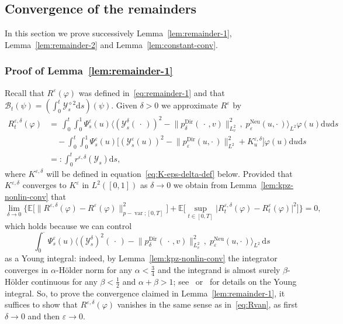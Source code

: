 \documentclass[AHL,Unicode,longabstracts]{cedram}
\DeclareMathOperator{\Dir}{Dir}
\DeclareMathOperator{\Neu}{Neu}
\DeclareMathOperator{\var}{var}
\newcommand{\mc}[1]{{\mathcal #1}}
\renewcommand{\mc}[1]{{\mathcal #1}}
\newcommand*{\dd}{\mathrm{d}}
\newcommand*{\ds}{\dd s}
\newcommand*{\du}{\dd u}
\begin{document}
\subsection{Convergence of the remainders}

In this section we prove successively Lemma~\ref{lem:remainder-1}, Lemma~\ref{lem:remainder-2} and Lemma~\ref{lem:constant-conv}.

\subsubsection{Proof of Lemma~\ref{lem:remainder-1}}

Recall that $R^\varepsilon(\varphi)$ was defined in~\eqref{eq:remainder-1} and that $\mc B_t(\psi)=(\int_0^t \mc Y_s^{\diamond 2} \ds)(\psi)$. Given $\delta > 0$ we approximate $R^{\varepsilon}$ by
\begin{align}\label{eq:r-eps-del-def}
\nonumber
R^{\varepsilon, \delta}_t (\varphi) & = \, \int_0^t \int_0^1
\Psi^{\varepsilon}_s (u) \Big\langle (\mc Y^{\delta}_s({\,\cdot\,}))^2 -\big\|p^{\Dir}_{\delta} (\,\cdot\,, v)
\big\|_{L^2_v}^2 \,,\; p^{\Neu}_{\varepsilon} (u, \cdot\,)\Big\rangle_{L^2} \varphi (u) \du \ds\\ \nonumber &\quad - \int_0^t \int_0^1 \Psi^{\varepsilon}_s (u) \Big[(\mc Y^{\varepsilon}_s (u))^2 -\big\|p^{\Dir}_{\varepsilon} (u, \cdot\,) \big\|_{L^2}^2 + K^{\varepsilon, \delta}_u \Big]
\varphi (u) \du \ds \\
& =: \int_0^t r^{\varepsilon,\delta}(\mc Y_s) \ds,
\end{align}
where $K^{\varepsilon, \delta}$ will be defined in equation~\eqref{eq:K-eps-delta-def} below. Provided that $K^{\varepsilon,\delta}$ converges to $K^{\varepsilon}$ in $L^2([0, 1])$ as $\delta \rightarrow 0$ we obtain from Lemma~\ref{lem:kpz-nonlin-conv} that
\[
\lim_{\delta \rightarrow 0} \Big\{ \mathbb{E} \Big[\big\| R^{\varepsilon, \delta} (\varphi) - R^{\varepsilon} (\varphi) \big\|_{p - \var ; [0, T]}^2\Big] +\mathbb{E} \Big[\sup_{t \in [0,T]} \big| R^{\varepsilon, \delta}_t (\varphi) - R^{\varepsilon}_t (\varphi) \big|^2\Big] \Big\} = 0,
\]
which holds because we can control
\[
\int_0^\cdot
\Psi^{\varepsilon}_s (u) \Big\langle (\mc Y^{\delta}_s)^2({\,\cdot\,}) -\big\|p^{\Dir}_{\delta} (\,\cdot\,, v)
\big\|_{L^2_v}^2 \,,\; p^{\Neu}_{\varepsilon} (u, \cdot\,)\Big\rangle_{L^2}\,\ds
\]
as a Young integral: indeed, by Lemma~\ref{lem:kpz-nonlin-conv} the integrator converges in $\alpha$-H\"older norm for any $\alpha < \frac34$ and the integrand is almost surely $\beta$-H\"older continuous for any $\beta < \frac12$ and $\alpha + \beta > 1$; see~\cite{Young1936} or~\cite[Section~1.3]{Lyons2007} for details on the Young integral. So, to prove the convergence claimed in Lemma~\ref{lem:remainder-1}, it suffices to show that $R^{\varepsilon, \delta} (\varphi)$ vanishes in the same sense as in~\eqref{eq:Rvan}, as first $\delta \rightarrow 0$ and then $\varepsilon \rightarrow 0$.
\end{document}
